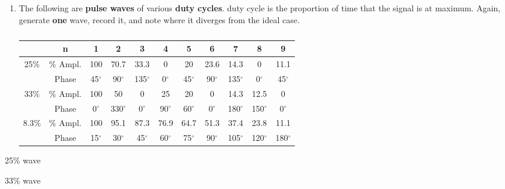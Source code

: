 \begin{enumerate}
\newpage
\item The following are {\bf pulse waves} of various {\bf duty cycles}. duty cycle is the proportion of time that the signal is at maximum. Again, generate {\bf one} wave, record it, and note where it diverges from the ideal case. 

\begin{table}
\footnotesize
\begin{tabular}{c|c|c|c|c|c|c|c|c|c|c|}
\cline{2-11}
&n&1&2&3&4&5&6&7&8&9\\ \hline
\multicolumn{1}{|c|}{\multirow{2}{*}{25\%}}&\% Ampl.&100&70.7&33.3&0&20&23.6&14.3&0&11.1\\
\multicolumn{1}{|c|}{}&Phase&45$^{\circ}$&90$^{\circ}$&135$^{\circ}$&0$^{\circ}$&45$^{\circ}$&90$^{\circ}$&135$^{\circ}$&0$^{\circ}$&45$^{\circ}$\\ \hline
\multicolumn{1}{|c|}{\multirow{2}{*}{33\%}}&\% Ampl.&100&50&0&25&20&0&14.3&12.5&0\\
\multicolumn{1}{|c|}{}&Phase&0$^{\circ}$&330$^{\circ}$&0$^{\circ}$&90$^{\circ}$&60$^{\circ}$&0$^{\circ}$&180$^{\circ}$&150$^{\circ}$&0$^{\circ}$\\ \hline
\multicolumn{1}{|c|}{\multirow{2}{*}{8.3\%}}&\% Ampl.&100&95.1&87.3&76.9&64.7&51.3&37.4&23.8&11.1\\
\multicolumn{1}{|c|}{}&Phase&15$^{\circ}$&30$^{\circ}$&45$^{\circ}$&60$^{\circ}$&75$^{\circ}$&90$^{\circ}$&105$^{\circ}$&120$^{\circ}$&180$^{\circ}$\\ \hline
\end{tabular}
\normalsize

\caption{ }
\label{tab:fs5}
\end{table}

\end{enumerate}


\begin{marginfigure}[+.5in]
\caption*{25\% wave}
\label{fig:fs14}
\end{marginfigure}

\begin{marginfigure}
\caption*{33\% wave}
\label{fig:fs15}
\end{marginfigure}

